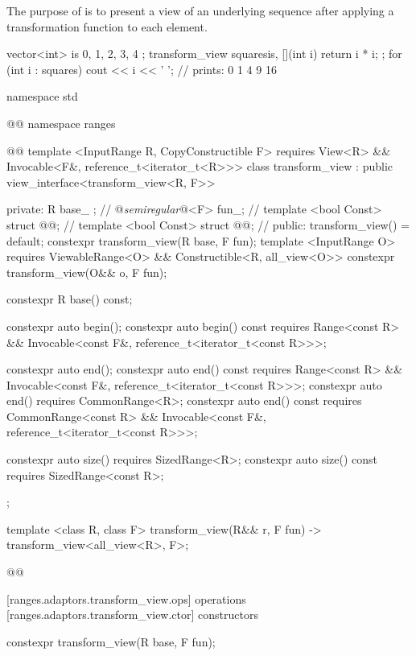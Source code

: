 \pnum
The purpose of  is to present a view of an underlying
sequence after applying a transformation function to each element.

\pnum
\enterexample
\begin{codeblock}
vector<int> is{ 0, 1, 2, 3, 4 };
transform_view squares{is, [](int i) { return i * i; }};
for (int i : squares)
  cout << i << ' '; // prints: 0 1 4 9 16
\end{codeblock}
\exitexample

\begin{codeblock}
namespace std { @@ namespace ranges { @@
  template <InputRange R, CopyConstructible F>
    requires View<R> && Invocable<F&, reference_t<iterator_t<R>>>
  class transform_view : public view_interface<transform_view<R, F>> {
  private:
    R base_ {}; // \expos
    @\textit{semiregular}@<F> fun_; // \expos
    template <bool Const>
      struct @@; // \expos
    template <bool Const>
      struct @@; // \expos
  public:
    transform_view() = default;
    constexpr transform_view(R base, F fun);
    template <InputRange O>
      requires ViewableRange<O> && Constructible<R, all_view<O>>
    constexpr transform_view(O&& o, F fun);

    constexpr R base() const;

    constexpr auto begin();
    constexpr auto begin() const requires Range<const R> &&
      Invocable<const F&, reference_t<iterator_t<const R>>>;

    constexpr auto end();
    constexpr auto end() const requires Range<const R> &&
      Invocable<const F&, reference_t<iterator_t<const R>>>;
    constexpr auto end() requires CommonRange<R>;
    constexpr auto end() const requires CommonRange<const R> &&
      Invocable<const F&, reference_t<iterator_t<const R>>>;

    constexpr auto size() requires SizedRange<R>;
    constexpr auto size() const requires SizedRange<const R>;
  };

  template <class R, class F>
  transform_view(R&& r, F fun) -> transform_view<all_view<R>, F>;
}}@\removed{\}\}}@
\end{codeblock}

[ranges.adaptors.transform_view.ops]{ operations}
[ranges.adaptors.transform_view.ctor]{ constructors}

%
\begin{itemdecl}
constexpr transform_view(R base, F fun);
\end{itemdecl}

